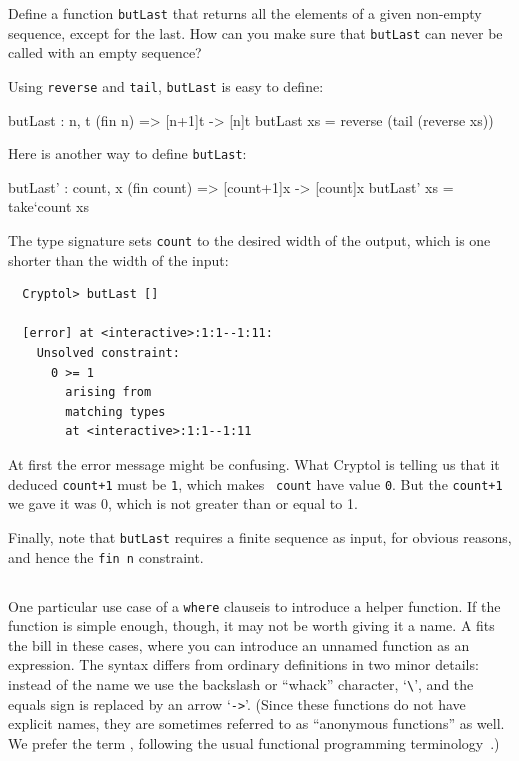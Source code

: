 \begin{Exercise}\label{ex:fn:3}
  Define a function {\tt butLast} that returns all the elements of a
  given non-empty sequence, except for the last.  How can you make
  sure that {\tt butLast} can never be called with an empty sequence?
  \indReverse\indTail\indWidth
\end{Exercise}
\begin{Answer}
  Using {\tt reverse} and {\tt tail}, {\tt butLast} is easy to
  define:\indReverse\indTail\indWidth
\begin{code}
  butLast : {n, t} (fin n) => [n+1]t -> [n]t
  butLast xs = reverse (tail (reverse xs))
\end{code}
Here is another way to define {\tt butLast}:
\begin{code}
  butLast' : {count, x} (fin count) => [count+1]x -> [count]x
  butLast' xs = take`{count} xs
\end{code}
The type signature sets {\tt count} to the desired width of the
output, which is one shorter than the width of the input:\indSignature
\begin{Verbatim}
  Cryptol> butLast []

  [error] at <interactive>:1:1--1:11:
    Unsolved constraint:
      0 >= 1
        arising from
        matching types
        at <interactive>:1:1--1:11
\end{Verbatim}
At first the error message might be confusing. What Cryptol is telling
us that it deduced {\tt count+1} must be {\tt 1}, which makes {\tt
  count} have value {\tt 0}.  But the {\tt count+1} we gave it was 0,
which is not greater than or equal to 1.

Finally, note that {\tt butLast} requires a finite sequence as input,
for obvious reasons, and hence the {\tt fin n} constraint.
\end{Answer}

\subsection{\texorpdfstring{\lamexs}{Lambda-expressions}}\label{sec:lamex}

One particular use case of a {\tt where} clause\indWhere is to
introduce a helper function. If the function is simple enough, though,
it may not be worth giving it a name. A \lamex fits the bill in these
cases, where you can introduce an unnamed function as an
expression. The syntax differs from ordinary definitions in two minor
details: instead of the name we use the backslash or ``whack''
character, `{\tt \Verb|\|}', and the equals sign is replaced by an
arrow `{\tt ->}'.  (Since these functions do not have explicit names,
they are sometimes referred to as ``anonymous functions'' as well. We
prefer the term \lamex, following the usual functional programming
terminology~\cite{Has98}.)

